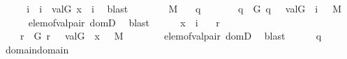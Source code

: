 \begin{isabellebody}
\ \ \ \ \isamarkupfalse%
\ \isamarkupfalse%
\ i\ \ {\isachardoublequoteopen}i\ {\isasymin}\ val{\isacharparenleft}{\kern0pt}G{\isacharcomma}{\kern0pt}{\isasymtau}{\isacharparenright}{\kern0pt}{\isachardoublequoteclose}\ {\isachardoublequoteopen}x\ {\isasymin}\ i{\isachardoublequoteclose}\ \isamarkupfalse%
\ blast\isanewline
\ \ \ \ \isamarkupfalse%
\ {\isacartoucheopen}{\isasymtau}\ {\isasymin}\ M{\isacartoucheclose}\ \isamarkupfalse%
\ {\isasymsigma}\ q\ \isanewline
\ \ \ \ \ \ {\isachardoublequoteopen}q\ {\isasymin}\ G{\isachardoublequoteclose}\ {\isachardoublequoteopen}{\isasymlangle}{\isasymsigma}{\isacharcomma}{\kern0pt}q{\isasymrangle}\ {\isasymin}\ {\isasymtau}{\isachardoublequoteclose}\ {\isachardoublequoteopen}val{\isacharparenleft}{\kern0pt}G{\isacharcomma}{\kern0pt}{\isasymsigma}{\isacharparenright}{\kern0pt}\ {\isacharequal}{\kern0pt}\ i{\isachardoublequoteclose}\ {\isachardoublequoteopen}{\isasymsigma}\ {\isasymin}\ M{\isachardoublequoteclose}\isanewline
\ \ \ \ \ \ \isamarkupfalse%
\ elem{\isacharunderscore}{\kern0pt}of{\isacharunderscore}{\kern0pt}val{\isacharunderscore}{\kern0pt}pair\ domD\ \isamarkupfalse%
\ blast\isanewline
\ \ \ \ \isamarkupfalse%
\ {\isacartoucheopen}x\ {\isasymin}\ i{\isacartoucheclose}\ \isamarkupfalse%
\ {\isasymtheta}\ r\ \isanewline
\ \ \ \ \ \ {\isachardoublequoteopen}r\ {\isasymin}\ G{\isachardoublequoteclose}\ {\isachardoublequoteopen}{\isasymlangle}{\isasymtheta}{\isacharcomma}{\kern0pt}r{\isasymrangle}\ {\isasymin}\ {\isasymsigma}{\isachardoublequoteclose}\ {\isachardoublequoteopen}val{\isacharparenleft}{\kern0pt}G{\isacharcomma}{\kern0pt}{\isasymtheta}{\isacharparenright}{\kern0pt}\ {\isacharequal}{\kern0pt}\ x{\isachardoublequoteclose}\ {\isachardoublequoteopen}{\isasymtheta}\ {\isasymin}\ M{\isachardoublequoteclose}\isanewline
\ \ \ \ \ \ \isamarkupfalse%
\ elem{\isacharunderscore}{\kern0pt}of{\isacharunderscore}{\kern0pt}val{\isacharunderscore}{\kern0pt}pair\ domD\ \isamarkupfalse%
\ blast\isanewline
\ \ \ \ \isamarkupfalse%
\ {\isacartoucheopen}{\isasymlangle}{\isasymsigma}{\isacharcomma}{\kern0pt}q{\isasymrangle}{\isasymin}{\isasymtau}{\isacartoucheclose}\ \isamarkupfalse%
\ {\isachardoublequoteopen}{\isasymtheta}\ {\isasymin}\ domain{\isacharparenleft}{\kern0pt}{\isasymUnion}{\isacharparenleft}{\kern0pt}domain{\isacharparenleft}{\kern0pt}{\isasymtau}{\isacharparenright}{\kern0pt}{\isacharparenright}{\kern0pt}{\isacharparenright}{\kern0pt}{\isachardoublequoteclose}\ \isamarkupfalse%

\end{isabellebody}

